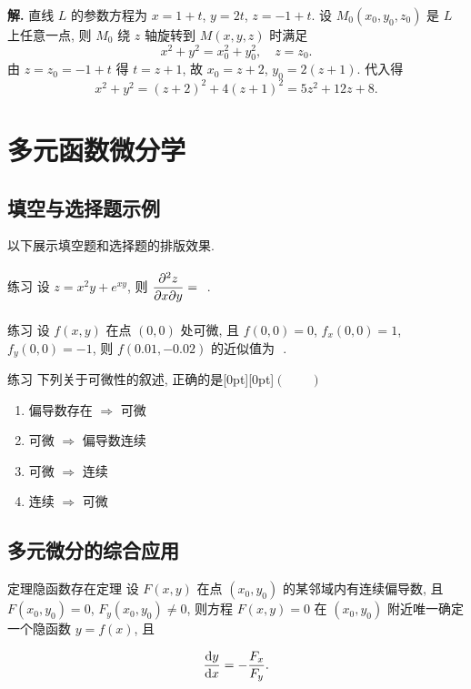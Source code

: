 \documentclass[a4paper,12pt,oneside,fontset=none]{ctexbook}
\let\olddfrac\dfrac
\renewcommand{\dfrac}[2]{
    \olddfrac{#1\vrule width 0pt height 1.15em depth 0em}{#2\vrule width 0pt height 0em depth 0.6em}
}
\newcommand{\fillin}[1][3cm]{\,\underline{\hspace{#1}}\,}
\newcommand{\selectbracket}{\unskip\nolinebreak\quad \raisebox{0.7pt}[0pt][0pt]{\mbox{$(\qquad)$}}\par}
\newcounter{theorem}[chapter]
\newenvironment{theorem}[1][]{\begin{thmBox}{定理}{#1}}{\end{thmBox}}
\newenvironment{exercise}[1][]{\begin{exBox}{练习}{#1}}{\end{exBox}}
\numberwithin{equation}{chapter}
\begin{document}
\textbf{解.} 直线 $L$ 的参数方程为 $x = 1 + t$, $y = 2t$, $z = -1 + t$. 设 $M_0(x_0, y_0, z_0)$ 是 $L$ 上任意一点, 则 $M_0$ 绕 $z$ 轴旋转到 $M(x, y, z)$ 时满足
\[
    x^2 + y^2 = x_0^2 + y_0^2, \quad z = z_0.
\]
由 $z = z_0 = -1 + t$ 得 $t = z + 1$, 故 $x_0 = z + 2$, $y_0 = 2(z+1)$. 代入得
\[
    x^2 + y^2 = (z+2)^2 + 4(z+1)^2 = 5z^2 + 12z + 8.
\]

\chapter{多元函数微分学}

\section{填空与选择题示例}

以下展示填空题和选择题的排版效果.

\begin{exercise}
设 $z = x^2y + e^{xy}$, 则 $\dfrac{\partial^2 z}{\partial x \partial y} = $ \fillin[4cm].
\end{exercise}

\begin{exercise}
设 $f(x,y)$ 在点 $(0,0)$ 处可微, 且 $f(0,0) = 0$, $f_x(0,0) = 1$, $f_y(0,0) = -1$, 则 $f(0.01, -0.02)$ 的近似值为 \fillin.
\end{exercise}

\begin{exercise}
下列关于可微性的叙述, 正确的是\selectbracket
\begin{enumerate}
    \item[A.] 偏导数存在 $\Longrightarrow$ 可微
    \item[B.] 可微 $\Longrightarrow$ 偏导数连续
    \item[C.] 可微 $\Longrightarrow$ 连续
    \item[D.] 连续 $\Longrightarrow$ 可微
\end{enumerate}
\end{exercise}

\section{多元微分的综合应用}

\begin{theorem}[隐函数存在定理]
设 $F(x, y)$ 在点 $(x_0, y_0)$ 的某邻域内有连续偏导数, 且 $F(x_0, y_0) = 0$, $F_y(x_0, y_0) \neq 0$, 则方程 $F(x,y) = 0$ 在 $(x_0, y_0)$ 附近唯一确定一个隐函数 $y = f(x)$, 且
\[
    \dfrac{\mathrm{d}y}{\mathrm{d}x} = -\dfrac{F_x}{F_y}.
\]
\end{theorem}
\end{document}

